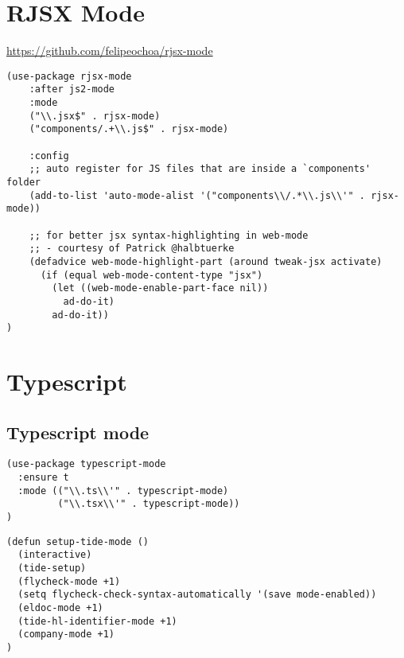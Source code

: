 \documentclass[11pt]{article}
\begin{document}
\section*{RJSX Mode}
\label{sec:org5f19f57}

\url{https://github.com/felipeochoa/rjsx-mode}

\begin{verbatim}
(use-package rjsx-mode
    :after js2-mode
    :mode
    ("\\.jsx$" . rjsx-mode)
    ("components/.+\\.js$" . rjsx-mode)

    :config
    ;; auto register for JS files that are inside a `components' folder
    (add-to-list 'auto-mode-alist '("components\\/.*\\.js\\'" . rjsx-mode))

    ;; for better jsx syntax-highlighting in web-mode
    ;; - courtesy of Patrick @halbtuerke
    (defadvice web-mode-highlight-part (around tweak-jsx activate)
      (if (equal web-mode-content-type "jsx")
        (let ((web-mode-enable-part-face nil))
          ad-do-it)
        ad-do-it))
)
\end{verbatim}

\section*{Typescript}
\label{sec:org8f6a14d}

\subsection*{Typescript mode}
\label{sec:org8b10feb}

\begin{verbatim}
(use-package typescript-mode
  :ensure t
  :mode (("\\.ts\\'" . typescript-mode)
         ("\\.tsx\\'" . typescript-mode))
)
\end{verbatim}

\begin{verbatim}
(defun setup-tide-mode ()
  (interactive)
  (tide-setup)
  (flycheck-mode +1)
  (setq flycheck-check-syntax-automatically '(save mode-enabled))
  (eldoc-mode +1)
  (tide-hl-identifier-mode +1)
  (company-mode +1)
)
\end{verbatim}
\end{document}
